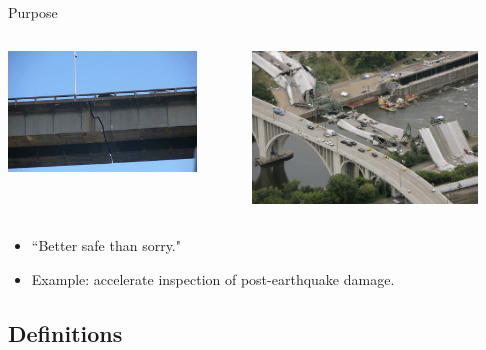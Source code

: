 \documentclass{beamer}
\begin{document}
\begin{frame}{Purpose}


\begin{columns}
		\begin{column}{0.5\textwidth} 
		\begin{center}
			\includegraphics[width=5cm]{images/crack.jpg}
		\end{center}
		\end{column}
		\begin{column}{0.7\textwidth}
		\begin{center}
			\pause
			\includegraphics[width=6cm]{images/minneapolis.jpg}
		\end{center}
		\end{column}
	\end{columns}

\vspace{1\baselineskip}
\begin{itemize}
\item ``Better safe than sorry."
\vspace{1\baselineskip}
\item Example: accelerate inspection of post-earthquake damage.
\end{itemize}
\end{frame}


\subsection{Definitions}
\end{document}
